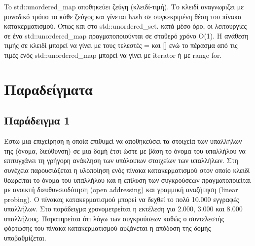 To std::unordered\_map αποθηκεύει ζεύγη (κλειδί-τιμή). Το κλειδί αναγνωριζει με μοναδικό τρόπο το κάθε ζεύγος και γίνεται hash σε συγκεκριμένη θέση του πίνακα κατακερματισμού. Όπως και στο std::unordered\_set. κατά μέσο όρο, οι λειτουργίες σε ένα std::unordered\_map πραγματοποιούνται σε σταθερό χρόνο O(1). Η ανάθεση τιμής σε κλειδί μπορεί να γίνει με τους τελεστές = και [] ενώ το πέρασμα από τις τιμές ενός std::unordered\_map μπορεί να γίνει με  iterator ή με range for.
 




%

\section{Παραδείγματα}

\subsection{Παράδειγμα 1}
Έστω μια επιχείρηση η οποία επιθυμεί να αποθηκεύσει τα στοιχεία των υπαλλήλων της (όνομα, διεύθυνση) σε μια δομή έτσι ώστε με βάση το όνομα του υπαλλήλου να επιτυγχάνει τη γρήγορη ανάκληση των υπόλοιπων στοιχείων των υπαλλήλων. Στη συνέχεια παρουσιάζεται η υλοποίηση ενός πίνακα κατακερματισμού στον οποίο κλειδί θεωρείται το όνομα του υπαλλήλου και η επίλυση των συγκρούσεων πραγματοποιείται με ανοικτή διευθυνσιοδότηση (open addressing) και γραμμική αναζήτηση (linear probing). Ο πίνακας κατακερματισμού μπορεί να δεχθεί το πολύ 10.000 εγγραφές υπαλλήλων. Στο παράδειγμα χρονομετρείται η εκτέλεση για 2.000, 3.000 και 8.000 υπαλλήλους. Παρατηρείται ότι λόγω των συγκρούσεων καθώς ο συντελεστής φόρτωσης του πίνακα κατακερματισμού αυξάνεται η απόδοση της δομής υποβαθμίζεται.

